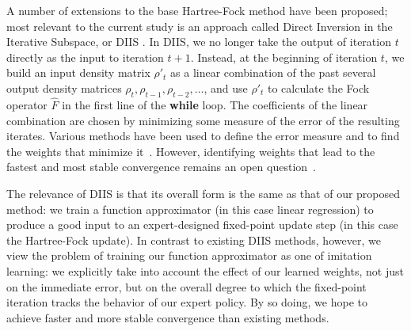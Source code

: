 \documentclass[twoside,11pt]{article}
\begin{document}
A number of extensions to the base Hartree-Fock method have been proposed; most relevant to the current study is an approach called Direct Inversion in the Iterative Subspace, or DIIS \citep{Pulay1980}.  In DIIS, we no longer take the output of iteration $t$ directly as the input to iteration $t+1$.  Instead, at the beginning of iteration $t$, we build an input density matrix $\rho'_{t}$ as a linear combination of the past several output density matrices $\rho_t, \rho_{t-1}, \rho_{t-2}, \ldots$, and use $\rho'_{t}$ to calculate the Fock operator $\hat F$ in the first line of the \textbf{while} loop.  The coefficients of the linear combination are chosen by minimizing some measure of the error of the resulting iterates.  Various methods have been used to define the error measure and to find the weights that minimize it~\citep{ADIIS,compScuseria,Alejandro2012}. However, identifying weights that lead to the fastest and most stable convergence remains an open question~\citep{Konstantin2002, Thorsten2011}.

The relevance of DIIS is that its overall form is the same as that of our proposed method: we train a function approximator (in this case linear regression) to produce a good input to an expert-designed fixed-point update step (in this case the Hartree-Fock update).  In contrast to existing DIIS methods, however, we view the problem of training our function approximator as one of imitation learning: we explicitly take into account the effect of our learned weights, not just on the immediate error, but on the overall degree to which the fixed-point iteration tracks the behavior of our expert policy.  By so doing, we hope to achieve faster and more stable convergence than existing methods.


\end{document}

